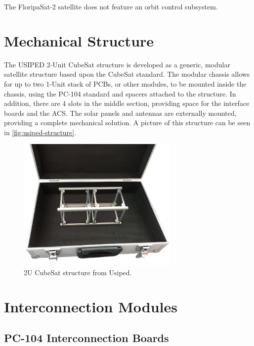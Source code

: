 The FloripaSat-2 satellite does not feature an orbit control subsystem.

\section{Mechanical Structure}

The USIPED 2-Unit CubeSat structure is developed as a generic, modular satellite structure based upon the CubeSat standard. The modular chassis allows for up to two 1-Unit stack of PCBs, or other modules, to be mounted inside the chassis, using the PC-104 standard and spacers attached to the structure. In addition, there are 4 slots in the middle section, providing space for the interface boards and the ACS. The solar panels and antennas are externally mounted, providing a complete mechanical solution. A picture of this structure can be seen in \autoref{fig:usiped-structure}.

\begin{figure}[!ht]
    \begin{center}
        \includegraphics[width=0.7\textwidth]{figures/usiped-2u-structure.jpg}
        \caption{2U CubeSat structure from Usiped.}
        \label{fig:usiped-structure}
    \end{center}
\end{figure}

\section{Interconnection Modules}

\subsection{PC-104 Interconnection Boards}

